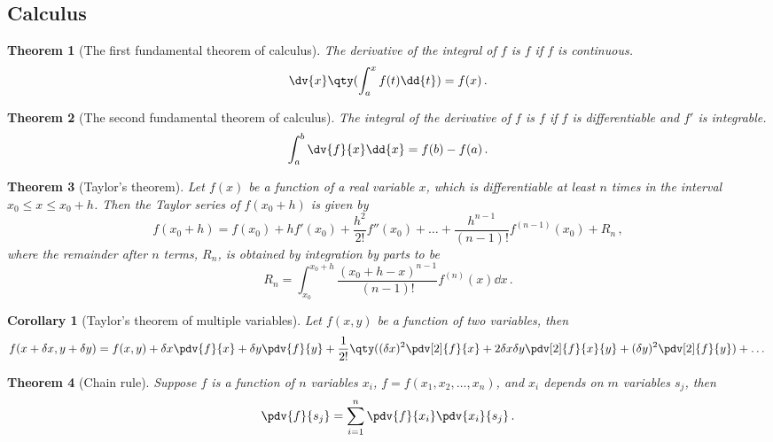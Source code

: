\documentclass{article}
\theoremstyle{plain}\theoremheaderfont{\normalfont\itshape}\theorembodyfont{\rmfamily}\theoremseparator{.}\newtheorem*{rem}{Remark}\newtheorem*{ex}{Example}\newtheorem*{proof}{Proof}\newtheorem*{altp}{Alternative proof}
\theoremstyle{plain}\theoremheaderfont{\normalfont\bfseries}\theorembodyfont{\rmfamily}\theoremseparator{.}\newtheorem{thm}{Theorem}[section]\newtheorem{lem}[thm]{Lemma}\newtheorem{prop}[thm]{Proposition}\newtheorem*{cor}{Corollary}\newtheorem{defn}[thm]{Definition}\newtheorem{clm}[thm]{Claim}\newtheorem{clminproof}{Claim}
\theoremstyle{break}\theoremheaderfont{\normalfont\itshape}\theorembodyfont{\rmfamily}\theoremseparator{.\medskip}\newtheorem*{proofskip}{Proof}\newtheorem*{exs}{Examples}\newtheorem*{rems}{Remarks}
\theoremstyle{break}\theoremheaderfont{\normalfont\bfseries}\theorembodyfont{\rmfamily}\theoremseparator{.\medskip}\newtheorem{lemskip}[thm]{Lemma}\newtheorem{defnskip}[thm]{Definition}\newtheorem{propskip}[thm]{Proposition}\newtheorem{thmskip}[thm]{Theorem}
\numberwithin{equation}{section}
\begin{document}
	\subsection{Calculus}
	\begin{thm}[The first fundamental theorem of calculus]
		The derivative of the integral of \(f\) is \(f\) if \(f\) is continuous.
		\[\dv{x}\qty(\int_{a}^{x}f(t)\dd{t})=f(x)\,.\]
	\end{thm}
	\begin{thm}[The second fundamental theorem of calculus]
		The integral of the derivative of \(f\) is \(f\) if \(f\) is differentiable and \(f'\) is integrable.
		\[\int_{a}^{b}\dv{f}{x}\dd{x}=f(b)-f(a)\,.\]
	\end{thm}
	\begin{thm}[Taylor's theorem]
		Let \(f(x)\) be a function of a real variable \(x\), which is differentiable at least \(n\) times in the interval \(x_0\le x\le x_0+h\). Then the Taylor series of \(f(x_0+h)\) is given by
		\[f(x_0+h)=f(x_0)+hf'(x_0)+\frac{h^2}{2!}f''(x_0)+\dots+\frac{h^{n-1}}{(n-1)!}f^{(n-1)}(x_0)+R_n\,,\]
		where the remainder after \(n\) terms, \(R_n\), is obtained by integration by parts to be
		\[R_n=\int_{x_0}^{x_0+h}\frac{(x_0+h-x)^{n-1}}{(n-1)!}f^{(n)}(x)\dd{x}\,.\]
	\end{thm}
	\begin{cor}[Taylor's theorem of multiple variables]
		Let \(f(x, y)\) be a function of two variables, then
		\[f(x+\delta x,y+\delta y)=f(x,y)+\delta x\pdv{f}{x}+\delta y\pdv{f}{y}+\frac{1}{2!}\qty((\delta x)^2\pdv[2]{f}{x}+2\delta x\delta y\pdv[2]{f}{x}{y}+(\delta y)^2\pdv[2]{f}{y})+\dots\]
	\end{cor}
	\begin{thm}[Chain rule]
		Suppose \(f\) is a function of \(n\) variables \(x_i\), \(f=f(x_1,x_2,\dots,x_n)\), and \(x_i\) depends on \(m\) variables \(s_j\), then
		\[\pdv{f}{s_j}=\sum_{i=1}^{n}\pdv{f}{x_i}\pdv{x_i}{s_j}\,.\]
	\end{thm}
\end{document}
